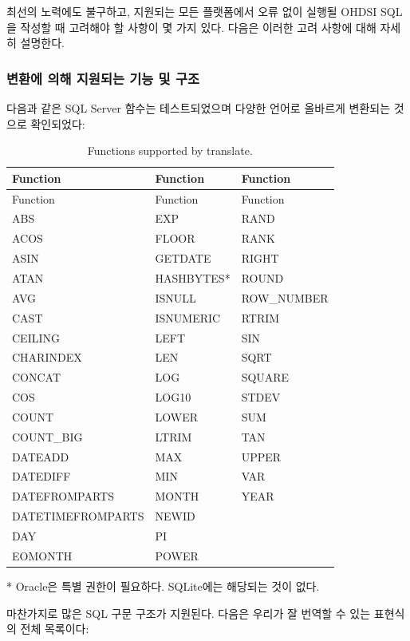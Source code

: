 \documentclass[11pt]{book}
\theoremstyle{definition}
\theoremstyle{definition}
\theoremstyle{definition}
\theoremstyle{remark}
\begin{document}
최선의 노력에도 불구하고, 지원되는 모든 플랫폼에서 오류 없이 실행될
OHDSI SQL을 작성할 때 고려해야 할 사항이 몇 가지 있다. 다음은 이러한
고려 사항에 대해 자세히 설명한다.

\subsubsection*{변환에 의해 지원되는 기능 및 구조}\label{-----}

다음과 같은 SQL Server 함수는 테스트되었으며 다양한 언어로 올바르게
변환되는 것으로 확인되었다: 

\begin{longtable}[]{@{}lll@{}}
\caption{\label{tab:sqlFunctions} Functions supported by
translate.}\tabularnewline
\toprule
Function & Function & Function\tabularnewline
\midrule
\endfirsthead
\toprule
Function & Function & Function\tabularnewline
\midrule
\endhead
ABS & EXP & RAND\tabularnewline
ACOS & FLOOR & RANK\tabularnewline
ASIN & GETDATE & RIGHT\tabularnewline
ATAN & HASHBYTES* & ROUND\tabularnewline
AVG & ISNULL & ROW\_NUMBER\tabularnewline
CAST & ISNUMERIC & RTRIM\tabularnewline
CEILING & LEFT & SIN\tabularnewline
CHARINDEX & LEN & SQRT\tabularnewline
CONCAT & LOG & SQUARE\tabularnewline
COS & LOG10 & STDEV\tabularnewline
COUNT & LOWER & SUM\tabularnewline
COUNT\_BIG & LTRIM & TAN\tabularnewline
DATEADD & MAX & UPPER\tabularnewline
DATEDIFF & MIN & VAR\tabularnewline
DATEFROMPARTS & MONTH & YEAR\tabularnewline
DATETIMEFROMPARTS & NEWID &\tabularnewline
DAY & PI &\tabularnewline
EOMONTH & POWER &\tabularnewline
\bottomrule
\end{longtable}

* Oracle은 특별 권한이 필요하다. SQLite에는 해당되는 것이 없다.

마찬가지로 많은 SQL 구문 구조가 지원된다. 다음은 우리가 잘 번역할 수
있는 표현식의 전체 목록이다:
\end{document}
